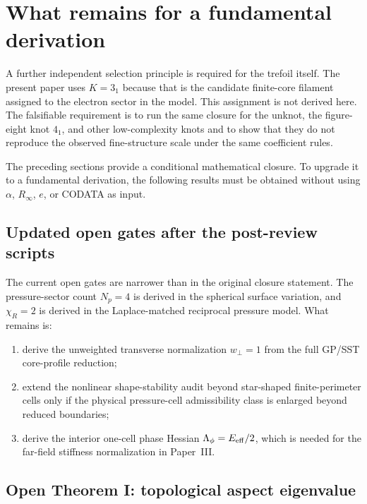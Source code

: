\documentclass[11pt]{article}
\begin{document}
\section{What remains for a fundamental derivation}

A further independent selection principle is required for the trefoil itself.
The present paper uses \(K=3_1\) because that is the candidate finite-core
filament assigned to the electron sector in the model.  This assignment is not
derived here.  The falsifiable requirement is to run the same closure for the
unknot, the figure-eight knot \(4_1\), and other low-complexity knots and to
show that they do not reproduce the observed fine-structure scale under the
same coefficient rules.

\label{sec:fundamental}

The preceding sections provide a conditional mathematical closure.  To upgrade it to a
fundamental derivation, the following results must be obtained without using \(\alpha\),
\(R_\infty\), \(e\), or CODATA as input.


\subsection{Updated open gates after the post-review scripts}

The current open gates are narrower than in the original closure statement.
The pressure-sector count \(N_p=4\) is derived in the spherical surface
variation, and \(\chi_R=2\) is derived in the Laplace-matched reciprocal
pressure model.  What remains is:
\begin{enumerate}[label=(G\arabic*)]
\item derive the unweighted transverse normalization \(w_\perp=1\) from the
full GP/SST core-profile reduction;
\item extend the nonlinear shape-stability audit beyond star-shaped finite-perimeter cells only if the physical pressure-cell admissibility class is enlarged beyond reduced boundaries;
\item derive the interior one-cell phase Hessian
\(\Lambda_\phi=E_{\rm eff}/2\), which is needed for the far-field stiffness
normalization in Paper~III.
\end{enumerate}

\subsection{Open Theorem I: topological aspect eigenvalue}
\end{document}

